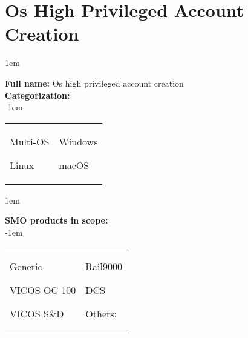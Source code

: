 
%
%

\section{Os High Privileged Account Creation}
\label{15026}

\openup 1em

\textbf{Full name:} Os high privileged account creation\hrulefill \\
{\bf Categorization:} \\

\openup -1em
\vspace{-3em}

\begin{tabular}{p{}p{}}

\begin{todolist}
  	\item Multi-OS
	\item Linux
\end{todolist}
&
\begin{todolist}
	\item[\done] Windows
	\item macOS
\end{todolist}

\end{tabular}

\openup 1em

{\bf SMO products in scope:} \\

\openup -1em
\vspace{-3em}

\begin{tabular}{p{}p{}}

\begin{todolist}
  \item[\done] Generic
  \item[\done] VICOS OC 100
  \item[\done] VICOS S\&D
\end{todolist}
&
\begin{todolist}
  \item Rail9000
  \item DCS
  \item Others: \hrulefill
\end{todolist}

\end{tabular}

